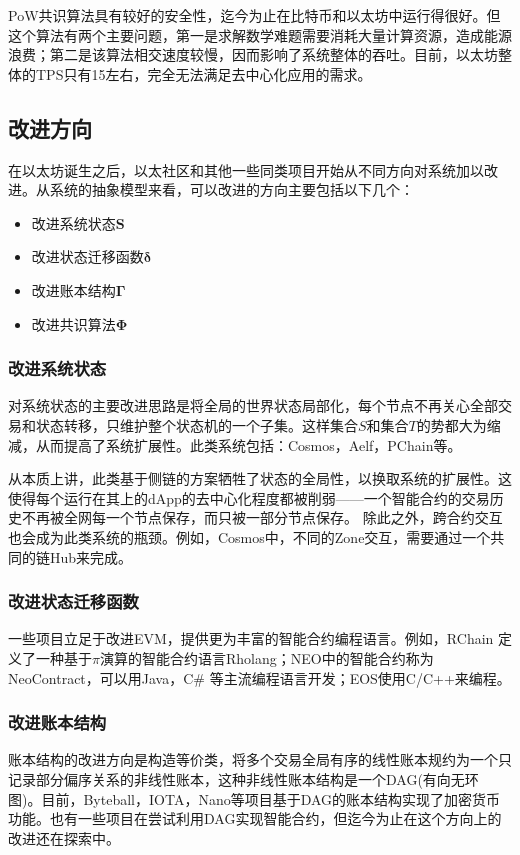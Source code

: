 \documentclass[UTF8,nofonts]{ctexart}
\begin{document}
\begin{multicols}{2}
PoW共识算法具有较好的安全性，迄今为止在比特币和以太坊中运行得很好。但这个算法有两个主要问题，第一是求解数学难题需要消耗大量计算资源，造成能源浪费；第二是该算法相交速度较慢，因而影响了系统整体的吞吐。目前，以太坊整体的TPS只有15左右，完全无法满足去中心化应用的需求。

\subsection{改进方向}
在以太坊诞生之后，以太社区和其他一些同类项目开始从不同方向对系统加以改进。从系统的抽象模型来看，可以改进的方向主要包括以下几个：
\begin{itemize}
	\item 改进系统状态$\boldsymbol{S}$	
	\item 改进状态迁移函数$\boldsymbol{\delta}$	
	\item 改进账本结构$\boldsymbol{\Gamma}$
	\item 改进共识算法$\boldsymbol{\Phi}$
\end{itemize}

\subsubsection{改进系统状态}
对系统状态的主要改进思路是将全局的世界状态局部化，每个节点不再关心全部交易和状态转移，只维护整个状态机的一个子集。这样集合$S$和集合$T$的势都大为缩减，从而提高了系统扩展性。此类系统包括：Cosmos\cite{cosmos}，Aelf\cite{aelf}，PChain等。

从本质上讲，此类基于侧链的方案牺牲了状态的全局性，以换取系统的扩展性。这使得每个运行在其上的dApp的去中心化程度都被削弱——一个智能合约的交易历史不再被全网每一个节点保存，而只被一部分节点保存。
除此之外，跨合约交互也会成为此类系统的瓶颈。例如，Cosmos中，不同的Zone交互，需要通过一个共同的链Hub来完成\cite{cosmos}。

\subsubsection{改进状态迁移函数}
一些项目立足于改进EVM，提供更为丰富的智能合约编程语言。例如，RChain	定义了一种基于$\pi$演算的智能合约语言Rholang；NEO中的智能合约称为NeoContract，可以用Java，C\# 等主流编程语言开发；EOS使用C/C++来编程。

\subsubsection{改进账本结构}
账本结构的改进方向是构造等价类，将多个交易全局有序的线性账本规约为一个只记录部分偏序关系的非线性账本，这种非线性账本结构是一个DAG(有向无环图)。目前，Byteball\cite{byteball}，IOTA\cite{iota}，Nano\cite{nano}等项目基于DAG的账本结构实现了加密货币功能。也有一些项目在尝试利用DAG实现智能合约，但迄今为止在这个方向上的改进还在探索中。


\end{multicols}
\end{document}
